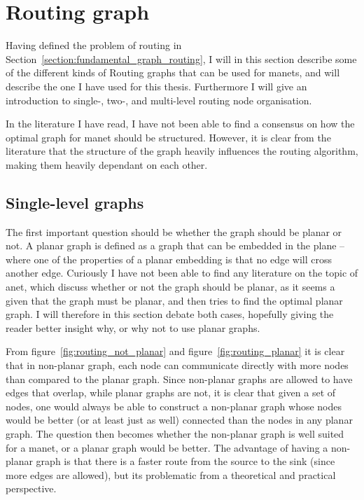 \section{Routing graph}
\label{section:routing_graph}

Having defined the problem of routing in Section~\ref{section:fundamental_graph_routing}, I will in this section describe some of the different kinds of Routing graphs that can be used for \acp{manet}, and will describe the one I have used for this thesis. Furthermore I will give an introduction to single-, two-, and multi-level routing node organisation. 

In the literature I have read, I have not been able to find a consensus on how the optimal graph for \ac{manet} should be structured. However, it is clear from the literature that the structure of the graph heavily influences the routing algorithm, making them heavily dependant on each other. 

\subsection{Single-level graphs}
\label{single_level}
The first important question should be whether the graph should be planar or not. A planar graph is defined as a graph that can be embedded in the plane -- where one of the properties of a planar embedding is that no edge will cross another edge.
Curiously I have not been able to find any literature on the topic of \ac{anet}, which discuss whether or not the graph should be planar, as it seems a given that the graph must be planar, and then tries to find the optimal planar graph. I will therefore in this section debate both cases, hopefully giving the reader better insight why, or why not to use planar graphs.

From figure~\ref{fig:routing_not_planar} and figure~\ref{fig:routing_planar} it is clear that in non-planar graph, each node can communicate directly with more nodes than compared to the planar graph. Since non-planar graphs are allowed to have edges that overlap, while planar graphs are not, it is clear that given a set of nodes, one would always be able to construct a non-planar graph whose nodes would be better (or at least just as well) connected than the nodes in any planar graph. The question then becomes whether the non-planar graph is well suited for a \ac{manet}, or a planar graph would be better. The advantage of having a non-planar graph is that there is a faster route from the source to the sink (since more edges are allowed), but its problematic from a theoretical and practical perspective.

